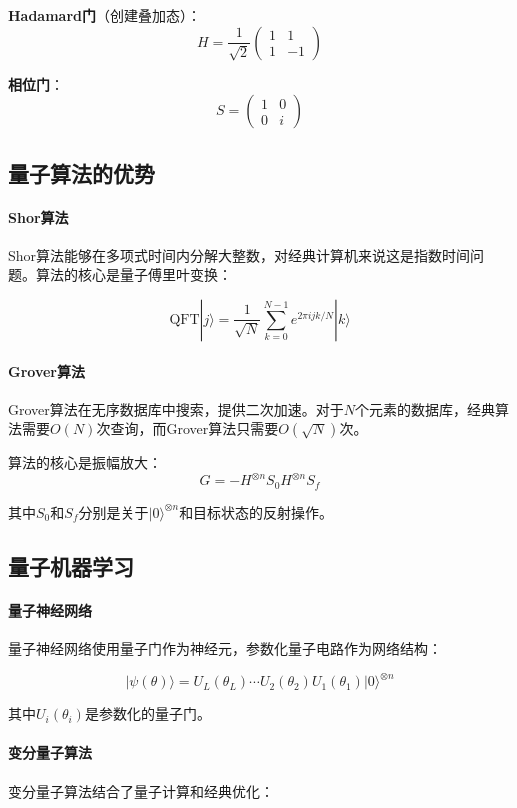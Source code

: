 \textbf{Hadamard门}（创建叠加态）：
$$H = \frac{1}{\sqrt{2}}\begin{pmatrix} 1 & 1 \\ 1 & -1 \end{pmatrix}$$

\textbf{相位门}：
$$S = \begin{pmatrix} 1 & 0 \\ 0 & i \end{pmatrix}$$

\subsection{量子算法的优势}

\paragraph{Shor算法}
Shor算法能够在多项式时间内分解大整数，对经典计算机来说这是指数时间问题。算法的核心是量子傅里叶变换：

$$\text{QFT}|j\rangle = \frac{1}{\sqrt{N}} \sum_{k=0}^{N-1} e^{2\pi ijk/N} |k\rangle$$

\paragraph{Grover算法}
Grover算法在无序数据库中搜索，提供二次加速。对于$N$个元素的数据库，经典算法需要$O(N)$次查询，而Grover算法只需要$O(\sqrt{N})$次。

算法的核心是振幅放大：
$$G = -H^{\otimes n} S_0 H^{\otimes n} S_f$$

其中$S_0$和$S_f$分别是关于$|0\rangle^{\otimes n}$和目标状态的反射操作。

\subsection{量子机器学习}

\paragraph{量子神经网络}
量子神经网络使用量子门作为神经元，参数化量子电路作为网络结构：

$$|\psi(\theta)\rangle = U_L(\theta_L) \cdots U_2(\theta_2) U_1(\theta_1) |0\rangle^{\otimes n}$$

其中$U_i(\theta_i)$是参数化的量子门。

\paragraph{变分量子算法}
变分量子算法结合了量子计算和经典优化：

